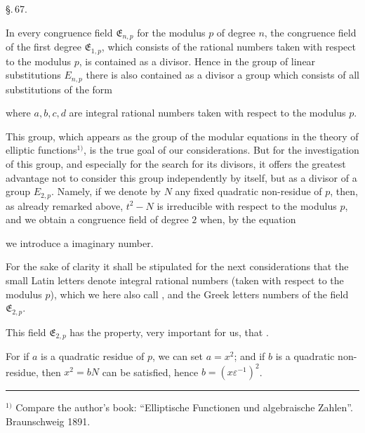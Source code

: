 
\begin{center}
\S.\,67.

\end{center}

In every congruence field $\mathfrak{E}_{n,p}$ for the modulus $p$ of degree
$n$, the congruence field of the first degree $\mathfrak{E}_{1,p}$, which
consists of the rational numbers taken with respect to the modulus $p$, is
contained as a divisor. Hence in the group of linear
substitutions $E_{n,p}$ there is also contained as a divisor a group which
consists of all substitutions of the form

where $a, b, c, d$ are integral rational numbers taken with respect to the
modulus $p$.

This group, which appears as the group of the modular equations
in the theory of elliptic functions$^{1)}$, is the
true goal of our considerations. But for the
investigation of this group, and especially for the search for
its divisors, it offers the greatest advantage not to consider this group
independently by itself, but as a divisor of a
group $E_{2,p}$. Namely, if we denote by $N$ any fixed
quadratic non-residue of $p$, then, as already remarked
above, $t^2-N$ is irreducible with respect to the modulus $p$, and we obtain
a congruence field of degree $2$ when, by the equation

we introduce a  imaginary number.

For the sake of clarity it shall be stipulated for the next
considerations that the small Latin letters denote
integral rational numbers (taken with respect to the modulus $p$), which we
here also call , and the Greek letters
numbers of the field $\mathfrak{E}_{2,p}$.

This field $\mathfrak{E}_{2,p}$ has the property, very important for us,
that .

For if $a$ is a quadratic residue of $p$, we can
set $a=x^2$; and if $b$ is a quadratic non-residue, then
$x^2=bN$ can be satisfied, hence $b=(x\varepsilon^{-1})^2$.

\rule{4cm}{0.4pt}

$^{1)}$ Compare the author's book: ``Elliptische Functionen und
algebraische Zahlen''. Braunschweig 1891.
